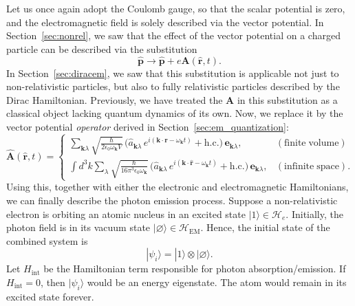 \documentclass[pra,12pt]{revtex4}
\begin{document}
Let us once again adopt the Coulomb gauge, so that the scalar
potential is zero, and the electromagnetic field is solely described
via the vector potential.  In Section~\ref{sec:nonrel}, we saw that
the effect of the vector potential on a charged particle can be
described via the substitution
\begin{equation}
  \hat{\mathbf{p}} \rightarrow \hat{\mathbf{p}} +
  e\mathbf{A}(\hat{\mathbf{r}},t).
\end{equation}
In Section~\ref{sec:diracem}, we saw that this substitution is
applicable not just to non-relativistic particles, but also to fully
relativistic particles described by the Dirac Hamiltonian.
Previously, we have treated the $\mathbf{A}$ in this substitution as a
classical object lacking quantum dynamics of its own.  Now, we replace
it by the vector potential \textit{operator} derived in
Section~\ref{sec:em_quantization}:
\begin{equation}
  \hat{\mathbf{A}}(\hat{\mathbf{r}},t) =
  \begin{cases}
    \displaystyle
    \sum_{\mathbf{k}\lambda} 
  \sqrt{\frac{\hbar}{2\epsilon_0\omega_{\mathbf{k}}V}}\,
  \Big(\hat{a}_{\mathbf{k}\lambda} \, e^{i(\mathbf{k}\cdot\mathbf{r} - \omega_{\mathbf{k}} t)}
  + \mathrm{h.c.}\Big)\, \mathbf{e}_{\mathbf{k}\lambda}, & (\mathrm{finite}\;\mathrm{volume}) \\
  \displaystyle \int d^3k \sum_{\lambda} 
  \sqrt{\frac{\hbar}{16\pi^3\epsilon_0\omega_{\mathbf{k}}}}\,
  \Big(\hat{a}_{\mathbf{k}\lambda} \, e^{i(\mathbf{k}\cdot\hat{\mathbf{r}} - \omega_{\mathbf{k}} t)}
  + \mathrm{h.c.}\Big)\, \mathbf{e}_{\mathbf{k}\lambda},
  & (\mathrm{infinite}\;\mathrm{space}).
  \end{cases}
  \label{Aoperator}
\end{equation}
Using this, together with either the electronic and electromagnetic
Hamiltonians, we can finally describe the photon emission process.
Suppose a non-relativistic electron is orbiting an atomic nucleus in
an excited state $|1\rangle \in \mathscr{H}_e$.  Initially, the photon
field is in its vacuum state $|\varnothing\rangle \in
\mathscr{H}_{\mathrm{EM}}$.  Hence, the initial state of the combined
system is
\begin{equation}
  |\psi_i\rangle = |1\rangle \otimes |\varnothing\rangle.
\end{equation}
Let $H_{\mathrm{int}}$ be the Hamiltonian term responsible for photon
absorption/emission.  If $H_{\mathrm{int}} = 0$, then $|\psi_i\rangle$
would be an energy eigenstate.  The atom would remain in its excited
state forever.
\end{document}

